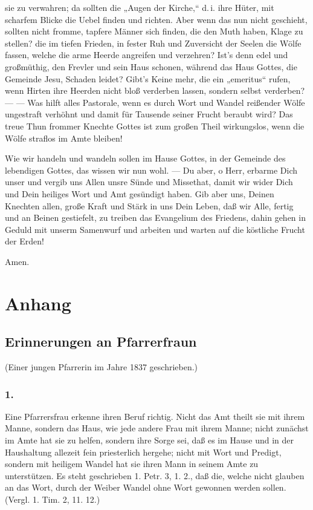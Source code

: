 sie zu verwahren; da sollten die „Augen der Kirche,“ d.\,i. ihre Hüter, mit scharfem Blicke die Uebel finden und richten. Aber wenn das nun nicht geschieht, sollten nicht fromme, tapfere Männer sich finden, die den Muth haben, Klage zu stellen? die im tiefen Frieden, in fester Ruh und Zuversicht der Seelen die Wölfe fassen, welche die arme Heerde angreifen und verzehren? Ist’s denn edel und großmüthig, den Frevler und sein Haus schonen, während das Haus Gottes, die Gemeinde Jesu, Schaden leidet? Gibt’s Keine mehr, die ein „emeritus“ rufen, wenn Hirten ihre Heerden nicht bloß verderben lassen, sondern selbst verderben? — — Was hilft alles Pastorale, wenn es durch Wort und Wandel reißender Wölfe ungestraft verhöhnt und damit für Tausende seiner Frucht beraubt wird? Das treue Thun frommer Knechte Gottes ist zum großen Theil wirkungslos, wenn die Wölfe straflos im Amte bleiben!

Wie wir handeln und wandeln sollen im Hause Gottes, in der Gemeinde des lebendigen Gottes, das wissen wir nun wohl. — Du aber, o Herr, erbarme Dich unser und vergib uns Allen unsre Sünde und Missethat, damit wir wider Dich und Dein heiliges Wort und Amt gesündigt haben. Gib aber uns, Deinen Knechten allen, große Kraft und Stärk in uns Dein Leben, daß wir Alle, fertig und an Beinen gestiefelt, zu treiben das Evangelium des Friedens, dahin gehen in Geduld mit unserm Samenwurf und arbeiten und warten auf die köstliche Frucht der Erden!

Amen.

\part{Anhang}


\chapter{Erinnerungen an Pfarrerfraun}

\begin{center}
(Einer jungen Pfarrerin im Jahre 1837 geschrieben.)
\end{center}

\section{1.}

Eine Pfarrersfrau erkenne ihren Beruf richtig. Nicht das Amt theilt sie mit ihrem Manne, sondern das Haus, wie jede andere Frau mit ihrem Manne; nicht zunächst im Amte hat sie zu helfen, sondern ihre Sorge sei, daß es im Hause und in der Haushaltung allezeit fein priesterlich hergehe; nicht mit Wort und Predigt, sondern mit heiligem Wandel hat sie ihren Mann in seinem Amte zu unterstützen. Es steht geschrieben 1. Petr. 3, 1. 2., daß die, welche nicht glauben an das Wort, durch der Weiber Wandel ohne Wort gewonnen werden sollen. (Vergl. 1. Tim. 2, 11. 12.)

